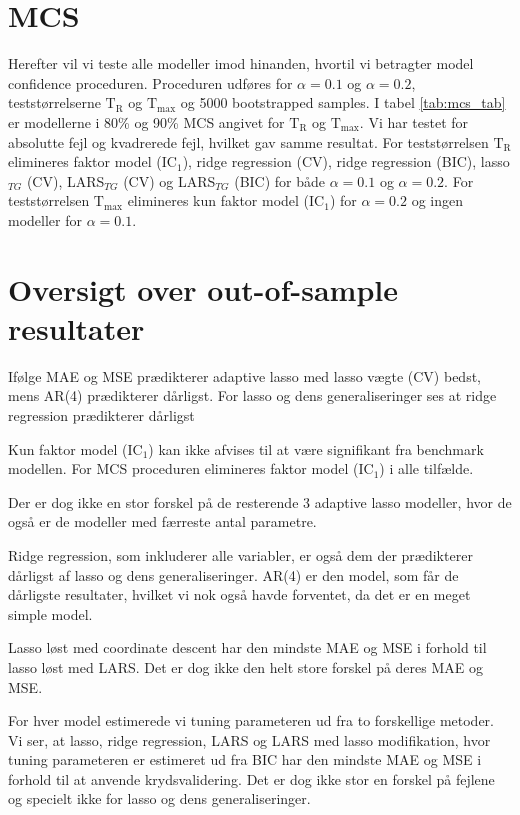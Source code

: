 \section{MCS} 
Herefter vil vi teste alle modeller imod hinanden, hvortil vi betragter model confidence proceduren.
Proceduren udføres for \(\alpha = 0.1\) og \(\alpha = 0.2\), teststørrelserne \(\text{T}_\text{R}\) og \(\text{T}_\text{max}\) og 5000 bootstrapped samples.
I tabel \ref{tab:mcs_tab} er modellerne i 80\% og 90\% MCS angivet for \(\text{T}_\text{R}\) og \(\text{T}_\text{max}\).
Vi har testet for absolutte fejl og kvadrerede fejl, hvilket gav samme resultat.
For teststørrelsen \(\text{T}_\text{R}\) elimineres faktor model (IC\(_1\)), ridge regression (CV), ridge regression (BIC), lasso\(_{TG}\) (CV), LARS\(_{TG}\) (CV) og LARS\(_{TG}\) (BIC) for både \(\alpha = 0.1\) og \(\alpha = 0.2\).
For teststørrelsen \(\text{T}_\text{max}\) elimineres kun faktor model (IC\(_1\)) for \(\alpha = 0.2\) og ingen modeller for \(\alpha = 0.1\).
%

%

\section{Oversigt over out-of-sample resultater}
Ifølge MAE og MSE prædikterer adaptive lasso med lasso vægte (CV) bedst, mens AR(4) prædikterer dårligst.
For lasso og dens generaliseringer ses at ridge regression prædikterer dårligst


Kun faktor model (IC\(_1\)) kan ikke afvises til at være signifikant fra benchmark modellen.
For MCS proceduren elimineres faktor model (IC\(_1\)) i alle tilfælde.

Der er dog ikke en stor forskel på de resterende 3 adaptive lasso modeller, hvor de også er de modeller med færreste antal parametre. 

Ridge regression, som inkluderer alle variabler, er også dem der prædikterer dårligst af lasso og dens generaliseringer. 
AR(4) er den model, som får de dårligste resultater, hvilket vi nok også havde forventet, da det er en meget simple model. 

Lasso løst med coordinate descent har den mindste MAE og MSE i forhold til lasso løst med LARS. Det er dog ikke den helt store forskel på deres MAE og MSE. 

For hver model estimerede vi tuning parameteren ud fra to forskellige metoder. Vi ser, at lasso, ridge regression, LARS og LARS med lasso modifikation, hvor tuning parameteren er estimeret ud fra BIC har den mindste MAE og MSE i forhold til at anvende krydsvalidering. Det er dog ikke stor en forskel på fejlene og specielt ikke for lasso og dens generaliseringer. 

